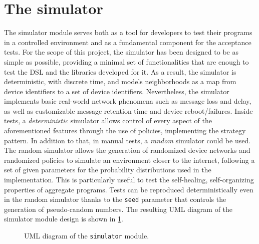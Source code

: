 \section{The simulator}

The simulator module serves both as a tool for developers to test their programs in a controlled environment and as a fundamental component for the acceptance tests.
%
For the scope of this project, the simulator has been designed to be as simple as possible, providing a minimal set of functionalities that are enough to test the \ac{DSL} and the libraries developed for it.
%
As a result, the simulator is deterministic, with discrete time, and models neighborhoods as a map from device identifiers to a set of device identifiers.
%
Nevertheless, the simulator implements basic real-world network phenomena such as message loss and delay, as well as customizable message retention time and device reboot/failures.
%
Inside tests, a \textit{deterministic} simulator allows control of every aspect of the aforementioned features through the use of policies, implementing the strategy pattern.
%
In addition to that, in manual tests, a \textit{random} simulator could be used.
%
The random simulator allows the generation of randomized device networks and randomized policies to simulate an environment closer to the internet, following a set of given parameters for the probability distributions used in the implementation.
%
This is particularly useful to test the self-healing, self-organizing properties of aggregate programs.
%
Tests can be reproduced deterministically even in the random simulator thanks to the \texttt{seed} parameter that controls the generation of pseudo-random numbers.
%
The resulting \ac{UML} diagram of the simulator module design is shown in \cref{fig:simulator-uml}.

\begin{figure}
    \centering
    \caption{\ac{UML} diagram of the \texttt{simulator} module.}
    \label{fig:simulator-uml}
    \bigskip
    \resizebox{\linewidth}{!}{
        
    }
\end{figure}
